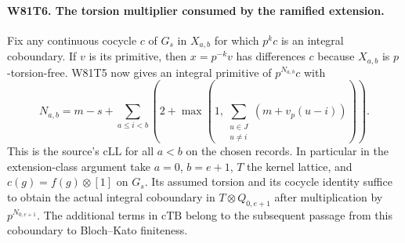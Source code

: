 \paragraph{W81T6. The torsion multiplier consumed by the ramified extension.}
Fix any continuous cocycle $c$ of $G_s$ in $X_{a,b}$ for which
$p^kc$ is an integral coboundary. If $v$ is its primitive, then
$x=p^{-k}v$ has differences $c$ because $X_{a,b}$ is
$p$-torsion-free. W81T5 now gives an integral primitive of
$p^{N_{a,b}}c$ with
\[
 N_{a,b}=m-s+
       \sum_{a\le i<b}\left(2+\max\left(1,
               \sum_{\substack{u\in J\\u\ne i}}
                      (m+v_p(u-i))\right)\right).
\]
This is the source's $\mathrm{cLL}$ for all $a<b$ on the chosen
records. In particular in the extension-class argument take $a=0$,
$b=e+1$, $T$ the kernel lattice, and
$c(g)=f(g)\otimes[1]$ on $G_s$. Its assumed torsion and its
cocycle identity suffice to obtain the actual integral coboundary
in $T\otimes Q_{0,e+1}$ after multiplication by $p^{N_{0,e+1}}$.
The additional terms in $\mathrm{cTB}$ belong to the subsequent
passage from this coboundary to Bloch--Kato finiteness.
